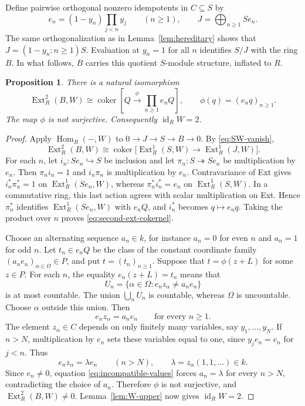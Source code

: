 \documentclass[11pt]{amsart}
\newtheorem{proposition}[theorem]{Proposition}
\theoremstyle{definition}
\DeclareMathOperator{\id}{id}
\DeclareMathOperator{\Hom}{Hom}
\DeclareMathOperator{\Ext}{Ext}
\DeclareMathOperator{\coker}{coker}
\newcommand{\into}{\hookrightarrow}
\newcommand{\onto}{\twoheadrightarrow}
\numberwithin{equation}{section}
\begin{document}
Define pairwise orthogonal nonzero idempotents in $C\subseteq S$ by
\begin{equation}\label{eq:y-idempotents}
 e_n=(1-y_n)\prod_{j<n}y_j\qquad(n\geq1),
 \qquad J=\bigoplus_{n\geq1}Se_n.
\end{equation}
The same orthogonalization as in Lemma~\ref{lem:hereditary} shows that
$J=(1-y_n:n\geq1)S$. Evaluation at $y_n=1$ for all $n$ identifies
$S/J$ with the ring $B$. In what follows, $B$ carries this quotient
$S$-module structure, inflated to $R$.

\begin{proposition}\label{prop:nonzero-ext}
There is a natural isomorphism
\begin{equation}\label{eq:second-ext-cokernel}
 \Ext_R^2(B,W)\cong
 \coker\left[Q\xrightarrow{\phi}\prod_{n\geq1}e_nQ\right],
 \qquad\phi(q)=(e_nq)_{n\geq1}.
\end{equation}
The map $\phi$ is not surjective. Consequently $\id_R W=2$.
\end{proposition}

\begin{proof}
Apply $\Hom_R(-,W)$ to $0\to J\to S\to B\to0$. By
\eqref{eq:SW-vanish},
\[
 \Ext_R^2(B,W)\cong
 \coker\bigl[\Ext_R^1(S,W)\longrightarrow\Ext_R^1(J,W)\bigr].
\]
For each $n$, let $i_n:Se_n\into S$ be inclusion and let
$\pi_n:S\onto Se_n$ be multiplication by $e_n$. Then
$\pi_ni_n=1$ and $i_n\pi_n$ is multiplication by $e_n$.
Contravariance of Ext gives $i_n^*\pi_n^*=1$ on
$\Ext_R^1(Se_n,W)$, whereas $\pi_n^*i_n^*=e_n$ on
$\Ext_R^1(S,W)$.
In a commutative ring, this last action agrees with scalar
multiplication on Ext. Hence $\pi_n^*$ identifies
$\Ext_R^1(Se_n,W)$ with $e_nQ$, and $i_n^*$ becomes
$q\mapsto e_nq$. Taking the product over $n$ proves
\eqref{eq:second-ext-cokernel}.

Choose an alternating sequence $a_n\in k$, for instance $a_n=0$
for even $n$ and $a_n=1$ for odd $n$. Let $t_n\in e_nQ$ be the
class of the constant coordinate family
$(a_ne_n)_{\alpha\in\Omega}\in P$, and put
$t=(t_n)_{n\geq1}$. Suppose that $t=\phi(z+L)$ for some $z\in P$.
For each $n$, the equality $e_n(z+L)=t_n$ means that
\[
 U_n=\{\alpha\in\Omega:e_nz_\alpha\ne a_ne_n\}
\]
is at most countable. The union $\bigcup_nU_n$ is countable, whereas
$\Omega$ is uncountable. Choose $\alpha$ outside this union. Then
\begin{equation}\label{eq:incompatible-values}
 e_nz_\alpha=a_ne_n\qquad\text{for every }n\geq1.
\end{equation}
The element $z_\alpha\in C$ depends on only finitely many variables,
say $y_1,\ldots,y_N$. If $n>N$, multiplication by $e_n$ sets these
variables equal to one, since $y_je_n=e_n$ for $j<n$. Thus
\[
 e_nz_\alpha=\lambda e_n\qquad(n>N),\qquad
 \lambda=z_\alpha(1,1,\ldots)\in k.
\]
Since $e_n\ne0$, equation \eqref{eq:incompatible-values} forces
$a_n=\lambda$ for every $n>N$, contradicting the choice of $a_n$.
Therefore $\phi$ is not surjective, and $\Ext_R^2(B,W)\ne0$.
Lemma~\ref{lem:W-upper} now gives $\id_R W=2$.
\end{proof}
\end{document}
